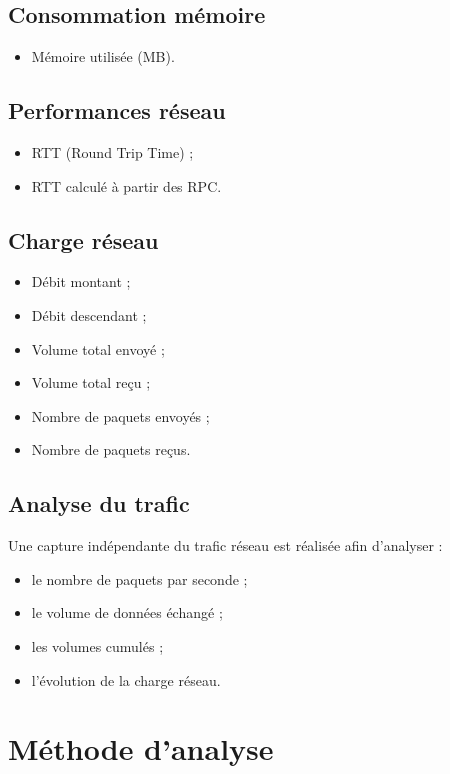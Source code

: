 \documentclass[11pt,a4paper]{article}
\begin{document}
\subsection{Consommation mémoire}

\begin{itemize}
\item Mémoire utilisée (MB).
\end{itemize}

\subsection{Performances réseau}

\begin{itemize}
\item RTT (Round Trip Time) ;
\item RTT calculé à partir des RPC.
\end{itemize}

\subsection{Charge réseau}

\begin{itemize}
\item Débit montant ;
\item Débit descendant ;
\item Volume total envoyé ;
\item Volume total reçu ;
\item Nombre de paquets envoyés ;
\item Nombre de paquets reçus.
\end{itemize}

\subsection{Analyse du trafic}

Une capture indépendante du trafic réseau est réalisée afin d'analyser :

\begin{itemize}
\item le nombre de paquets par seconde ;
\item le volume de données échangé ;
\item les volumes cumulés ;
\item l'évolution de la charge réseau.
\end{itemize}

\section{Méthode d'analyse}
\end{document}

